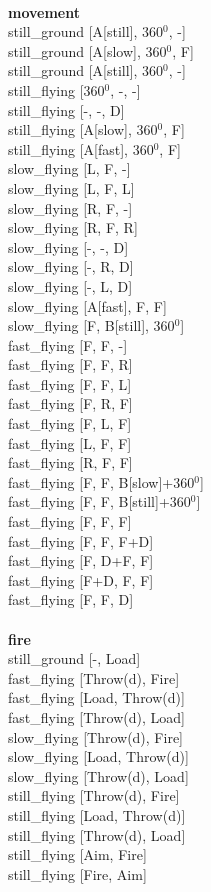 \ \\ {\bf movement } \\
still_ground [A[still], 360$^0$, -] \\
still_ground [A[slow], 360$^0$, F] \\
still_ground [A[still], 360$^0$, -] \\
still_flying [360$^0$, -, -] \\
still_flying [-, -, D] \\
still_flying [A[slow], 360$^0$, F] \\
still_flying [A[fast], 360$^0$, F] \\
slow_flying [L, F, -] \\
slow_flying [L, F, L] \\
slow_flying [R, F, -] \\
slow_flying [R, F, R] \\
slow_flying [-, -, D] \\
slow_flying [-, R, D] \\
slow_flying [-, L, D] \\
slow_flying [A[fast], F, F] \\
slow_flying [F, B[still], 360$^0$] \\
fast_flying [F, F, -] \\
fast_flying [F, F, R] \\
fast_flying [F, F, L] \\
fast_flying [F, R, F] \\
fast_flying [F, L, F] \\
fast_flying [L, F, F] \\
fast_flying [R, F, F] \\
fast_flying [F, F, B[slow]+360$^0$] \\
fast_flying [F, F, B[still]+360$^0$] \\
fast_flying [F, F, F] \\
fast_flying [F, F, F+D] \\
fast_flying [F, D+F, F] \\
fast_flying [F+D, F, F] \\
fast_flying [F, F, D] \\
\ \\ {\bf fire } \\
still_ground [-, Load] \\
fast_flying [Throw(d), Fire] \\
fast_flying [Load, Throw(d)] \\
fast_flying [Throw(d), Load] \\
slow_flying [Throw(d), Fire] \\
slow_flying [Load, Throw(d)] \\
slow_flying [Throw(d), Load] \\
still_flying [Throw(d), Fire] \\
still_flying [Load, Throw(d)] \\
still_flying [Throw(d), Load] \\
still_flying [Aim, Fire] \\
still_flying [Fire, Aim] \\


